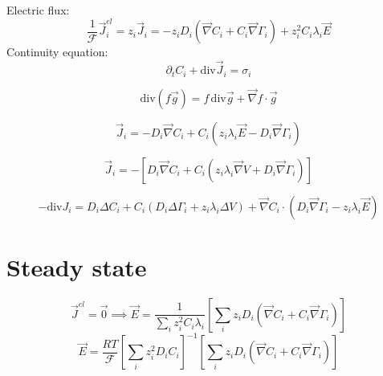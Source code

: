 \documentclass[aps,12pt]{revtex4}
\begin{document}
Electric flux:
\begin{equation}
	\dfrac{1}{\mathcal{F}} \vec{J}_i^{el} =  z_i \vec{J}_i = - z_i D_i \left( \vec{\nabla} C_i + C_i \vec{\nabla}\Gamma_i \right) + z_i^2 C_i \lambda_i \vec{E}
\end{equation}
Continuity equation:
\begin{equation}
	\partial_t C_i + \mathrm{div} \vec{J}_i = \sigma_i
\end{equation}

\begin{equation}
	\mathrm{div}(f\vec{g}) = f \, \mathrm{div}\vec{g} + \vec{\nabla} f \cdot \vec{g}
\end{equation}

\begin{equation}
	\vec{J}_i = -D_i \vec{\nabla} C_i + C_i \left( z_i \lambda_i \vec{E} - D_i \vec{\nabla}\Gamma_i \right)
\end{equation}

\begin{equation}
	\vec{J}_i = - \left[ D_i \vec{\nabla} C_i + C_i \left( z_i \lambda_i \vec{\nabla} V + D_i \vec{\nabla}\Gamma_i \right) \right]
\end{equation}

\begin{equation}
	-\mathrm{div} J_i = D_i \Delta C_i + C_i \left( D_i \Delta \Gamma_i + z_i \lambda_i \Delta V \right)
	+ \vec{\nabla} C_i \cdot \left(  D_i \vec{\nabla}\Gamma_i - z_i \lambda_i \vec{E} \right) 
\end{equation}

\section{Steady state}

\begin{equation}
\vec{J}^{el} = \vec{0} \implies \vec{E} = \dfrac{1}{ \sum_i z_i^2 C_i \lambda_i } \left[\sum_i  z_i D_i \left( \vec{\nabla} C_i + C_i \vec{\nabla}\Gamma_i \right)\right]
\end{equation}
\begin{equation}
	\vec{E} = \dfrac{RT}{\mathcal{F}} \left[\sum_i z_i^2 D_i C_i \right]^{-1} 
	\left[\sum_i  z_i D_i \left( \vec{\nabla} C_i + C_i \vec{\nabla}\Gamma_i \right)\right]
\end{equation}
\end{document}

